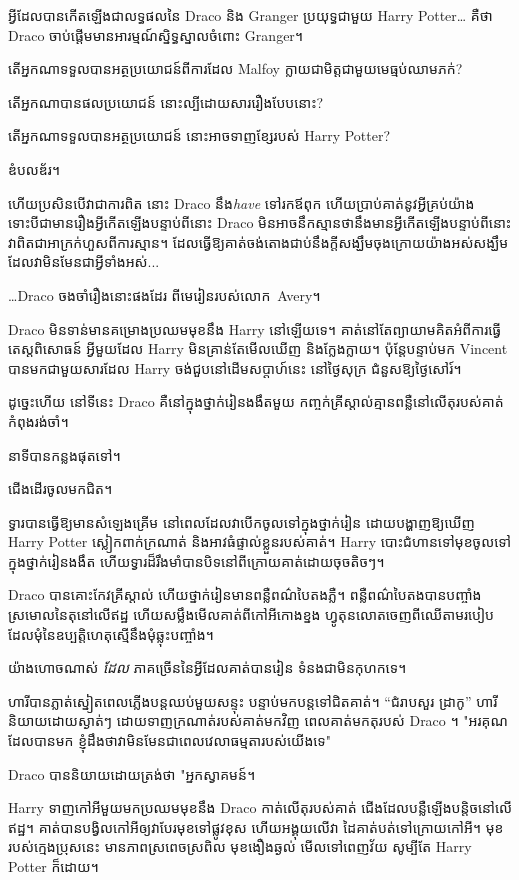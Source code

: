 អ្វី​ដែល​បាន​កើត​ឡើង​ជា​លទ្ធផល​នៃ Draco និង Granger ប្រយុទ្ធ​ជាមួយ Harry Potter… គឺ​ថា Draco ចាប់​ផ្ដើម​មាន​អារម្មណ៍​ស្និទ្ធស្នាល​ចំពោះ Granger។

តើអ្នកណាទទួលបានអត្ថប្រយោជន៍ពីការដែល Malfoy ក្លាយជាមិត្តជាមួយមេធ្មប់ឈាមភក់?

តើអ្នកណាបានផលប្រយោជន៍ នោះល្បីដោយសាររឿងបែបនោះ?

តើអ្នកណាទទួលបានអត្ថប្រយោជន៍ នោះអាចទាញខ្សែរបស់ Harry Potter?

ឌំបលឌ័រ។

ហើយប្រសិនបើវាជាការពិត នោះ Draco នឹង\emph{have} ទៅរកឪពុក ហើយប្រាប់គាត់នូវអ្វីគ្រប់យ៉ាង ទោះបីជាមានរឿងអ្វីកើតឡើងបន្ទាប់ពីនោះ Draco មិនអាចនឹកស្មានថានឹងមានអ្វីកើតឡើងបន្ទាប់ពីនោះ វាពិតជាអាក្រក់ហួសពីការស្មាន។ ដែល​ធ្វើ​ឱ្យ​គាត់​ចង់​តោង​ជាប់​នឹង​ក្តី​សង្ឃឹម​ចុង​ក្រោយ​យ៉ាង​អស់​សង្ឃឹម ដែល​វា​មិន​មែន​ជា​អ្វី​ទាំង​អស់...

…Draco ចងចាំរឿងនោះផងដែរ ពីមេរៀនរបស់លោក~Avery។

Draco មិនទាន់មានគម្រោងប្រឈមមុខនឹង Harry នៅឡើយទេ។ គាត់នៅតែព្យាយាមគិតអំពីការធ្វើតេស្តពិសោធន៍ អ្វីមួយដែល Harry មិនគ្រាន់តែមើលឃើញ និងក្លែងក្លាយ។ ប៉ុន្តែបន្ទាប់មក Vincent បានមកជាមួយសារដែល Harry ចង់ជួបនៅដើមសប្តាហ៍នេះ នៅថ្ងៃសុក្រ ជំនួសឱ្យថ្ងៃសៅរ៍។

ដូច្នេះហើយ នៅទីនេះ Draco គឺនៅក្នុងថ្នាក់រៀនងងឹតមួយ កញ្ចក់គ្រីស្តាល់គ្មានពន្លឺនៅលើតុរបស់គាត់កំពុងរង់ចាំ។

នាទីបានកន្លងផុតទៅ។

ជើង​ដើរ​ចូល​មក​ជិត។

ទ្វារបានធ្វើឱ្យមានសំឡេងគ្រើម នៅពេលដែលវាបើកចូលទៅក្នុងថ្នាក់រៀន ដោយបង្ហាញឱ្យឃើញ Harry Potter ស្លៀកពាក់ក្រណាត់ និងអាវធំផ្ទាល់ខ្លួនរបស់គាត់។ Harry បោះជំហានទៅមុខចូលទៅក្នុងថ្នាក់រៀនងងឹត ហើយទ្វារដ៏រឹងមាំបានបិទនៅពីក្រោយគាត់ដោយចុចតិចៗ។

Draco បាន​គោះ​កែវ​គ្រីស្តាល់ ហើយ​ថ្នាក់រៀន​មាន​ពន្លឺ​ពណ៌​បៃតង​ភ្លឺ។ ពន្លឺពណ៌បៃតងបានបញ្ចាំងស្រមោលនៃតុនៅលើឥដ្ឋ ហើយសម្លឹងមើលគាត់ពីកៅអីកោងខ្នង ហ្វូតុនលោតចេញពីឈើតាមរបៀបដែលមុំនៃឧប្បត្តិហេតុស្មើនឹងមុំឆ្លុះបញ្ចាំង។

យ៉ាងហោចណាស់ \emph{ដែល} ភាគច្រើននៃអ្វីដែលគាត់បានរៀន ទំនងជាមិនកុហកទេ។

ហារី​បាន​ភ្លាត់ស្នៀត​ពេល​ភ្លើង​បន្ត​ឈប់​មួយ​សន្ទុះ បន្ទាប់​មក​បន្ត​ទៅ​ជិត​គាត់។ “ជំរាបសួរ ដ្រាកូ” ហារី និយាយដោយស្ងាត់ៗ ដោយទាញក្រណាត់របស់គាត់មកវិញ ពេលគាត់មកតុរបស់ Draco ។ "អរគុណដែលបានមក ខ្ញុំដឹងថាវាមិនមែនជាពេលវេលាធម្មតារបស់យើងទេ"

Draco បាននិយាយដោយត្រង់ថា "អ្នកស្វាគមន៍។

Harry ទាញកៅអីមួយមកប្រឈមមុខនឹង Draco កាត់លើតុរបស់គាត់ ជើងដែលបន្លឺឡើងបន្តិចនៅលើឥដ្ឋ។ គាត់​បាន​បង្វិល​កៅអី​ឲ្យ​វា​បែរ​មុខ​ទៅ​ផ្លូវ​ខុស ហើយ​អង្គុយ​លើ​វា ដៃ​គាត់​បត់​ទៅ​ក្រោយ​កៅអី។ មុខរបស់ក្មេងប្រុសនេះ មានភាពស្រពេចស្រពិល មុខងឿងឆ្ងល់ មើលទៅពេញវ័យ សូម្បីតែ Harry Potter ក៏ដោយ។

